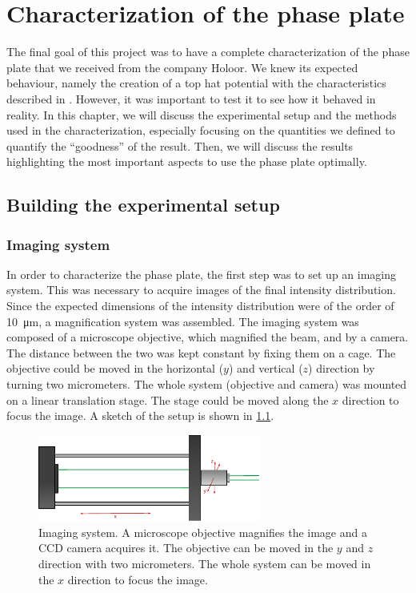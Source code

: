 \chapter{Characterization of the phase plate}
The final goal of this project was to have a complete characterization of the phase plate that we received from the company Holoor. We knew its expected behaviour, namely the creation of a top hat potential with the characteristics described in . However, it was important to test it to see how it behaved in reality. In this chapter, we will discuss the experimental setup and the methods used in the characterization, especially focusing on the quantities we defined to quantify the \enquote{goodness} of the result. Then, we will discuss the results highlighting the most important aspects to use the phase plate optimally.

\section{Building the experimental setup}
\subsection{Imaging system}
In order to characterize the phase plate, the first step was to set up an imaging system. This was necessary to acquire images of the final intensity distribution. Since the expected dimensions of the intensity distribution were of the order of \SI{10}{\micro\meter}, a magnification system was assembled. The imaging system was composed of a microscope objective, which magnified the beam, and by a camera. The distance between the two was kept constant by fixing them on a cage. The objective could be moved in the horizontal ($y$) and vertical ($z$) direction by turning two micrometers. The whole system (objective and camera) was mounted on a linear translation stage. The stage could be moved along the $x$ direction to focus the image. A sketch of the setup is shown in \cref{fig:imaging}.

\begin{figure}
    \centering
    \includegraphics[width=0.65\textwidth]{chapters/chapter_3/figures/imaging}
    \caption{Imaging system. A microscope objective magnifies the image and a CCD camera acquires it. The objective can be moved in the $y$ and $z$ direction with two micrometers. The whole system can be moved in the $x$ direction to focus the image.}
    \label{fig:imaging}
\end{figure}

